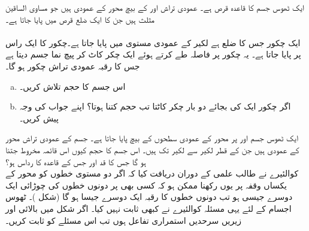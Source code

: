ایک ٹھوس جسم کا قاعدہ قرص  ہے۔ عمودی تراش     اور  کے بیچ  محور کے عمودی ہیں جو مساوی الساقین مثلث ہیں جن کا ایک ضلع قرص میں پایا جاتا ہے۔
\\
\\
ایک چکور جس کا ضلع  ہے لکیر  کے عمودی مستوی میں پایا جاتا ہے۔چکور کا ایک راس  پر پایا جاتا ہے۔ یہ چکور  پر  فاصلہ طے کرتے ہوئے ایک چکر کاٹ کر پیچ نما جسم دیتا ہے جس کا رقبہ عمودی تراش چکور ہو گا۔
\begin{enumerate}[a.]
\item
اس جسم کا حجم تلاش کریں۔
\item
اگر چکور ایک کی بجائے دو بار چکر کاٹتا تب حجم کتنا ہوتا؟ اپنے جواب کی وجہ پیش کریں۔ 
\end{enumerate} 

ایک ٹھوس جسم  اور  پر   محور کے عمودی سطحوں کے بیچ پایا جاتا ہے۔ جسم کے عمودی تراش  محور کے عمودی ہیں جن کے  قطر لکیر  سے لکیر  تک ہیں۔ اس جسم کا حجم کیوں اس قائمہ مخروط جتنا ہو گا جس کا قد  اور جس کے قاعدہ کا رداس  ہو؟ 
\\
کوالئیرے نے طالب علمی کے دوران دریافت کیا کہ اگر دو مستوی خطوں کو  محور کے یکساں وقفہ پر یوں رکھنا ممکن ہو کہ کسی بھی  پر دونوں خطوں کی چوڑائی ایک دوسرے جیسی ہو تب دونوں خطوں کا رقبہ ایک دوسرے جیسا ہو گا (شکل )۔ ٹھوس اجسام کے لئے یہی مسئلہ کوالئیرے نے کبھی ثابت نہیں کیا۔ اگر شکل  میں بالائی اور زیریں سرحدیں استمراری تفاعل ہوں تب اس مسئلے کو ثابت کریں۔

